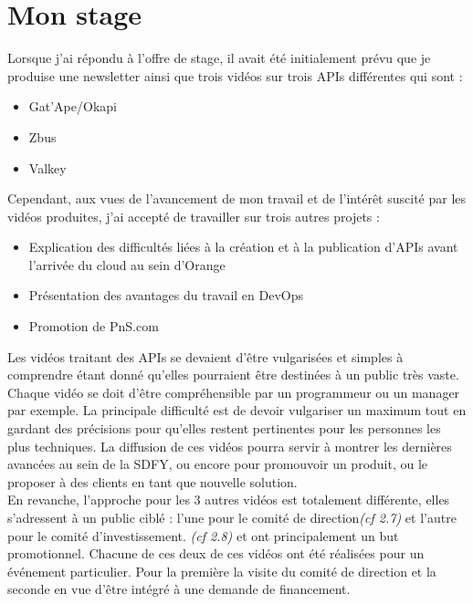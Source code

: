 \chapter{Mon stage}
\label{sec:unchapitre}

Lorsque j'ai répondu à l'offre de stage, il avait été initialement prévu que je produise une newsletter ainsi que trois vidéos sur trois APIs différentes qui sont :

\begin{itemize}
    \item Gat'Ape/Okapi
    \item Zbus
    \item Valkey
\end{itemize}

Cependant, aux vues de l'avancement de mon travail et de l'intérêt suscité par les vidéos produites, j'ai accepté de travailler sur trois autres projets :

\begin{itemize}
    \item Explication des difficultés liées à la création et à la publication d'APIs avant l'arrivée du cloud au sein d'Orange
    \item Présentation des avantages du travail en DevOps
    \item Promotion de PnS.com
\end{itemize}



Les vidéos traitant des APIs se devaient d'être vulgarisées et simples à comprendre étant donné qu'elles pourraient être destinées à un public très vaste. Chaque vidéo se doit d'être compréhensible par un programmeur ou un manager par exemple. La principale difficulté est de devoir vulgariser un maximum tout en gardant des précisions pour qu'elles restent pertinentes pour les personnes les plus techniques. La diffusion de ces vidéos pourra servir à montrer les dernières avancées au sein de la SDFY, ou encore pour promouvoir un produit, ou le proposer à des clients en tant que nouvelle solution. \\

En revanche, l'approche pour les 3 autres vidéos est totalement différente, elles s'adressent à un public ciblé : l'une pour le comité de direction\textit{(cf 2.7)} et l'autre pour le comité d'investissement. \textit{(cf 2.8)} et ont principalement un but promotionnel. Chacune de ces deux de ces vidéos ont été réalisées pour un événement particulier. Pour la première la visite du comité de direction et la seconde en vue d'être intégré à une demande de financement. \\



